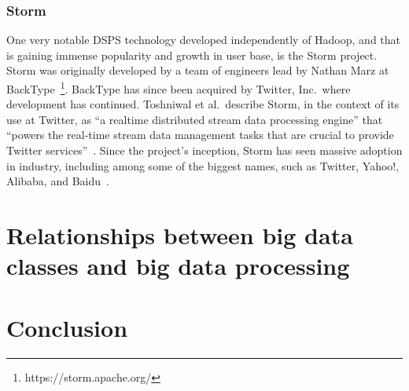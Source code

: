 \documentclass[a4paper,11pt]{article}
\begin{document}


\subsubsection{Storm} %
\label{ssub:storm}

One very notable DSPS technology developed independently of Hadoop, and that is gaining immense popularity and growth in
user base, is the Storm project. Storm was originally developed by a team of engineers lead by Nathan Marz at
BackType~\footnote{https://storm.apache.org/}. BackType has since been acquired by Twitter, Inc.\ where development has
continued. Toshniwal et al.\ describe Storm, in the context of its use at Twitter, as ``a realtime distributed stream
data processing engine'' that ``powers the real-time stream data management tasks that are crucial to provide Twitter
services''~\cite{toshniwal2014storm}. Since the project's inception, Storm has seen massive adoption in industry,
including among some of the biggest names, such as Twitter, Yahoo!, Alibaba, and Baidu~\cite{storm_users}.





\section{Relationships between big data classes and big data processing} %
\label{sec:relationships_between_big_data_classes_and_big_data_processing}



\section{Conclusion} %
\label{sec:conclusion}


\newpage



\end{document}
